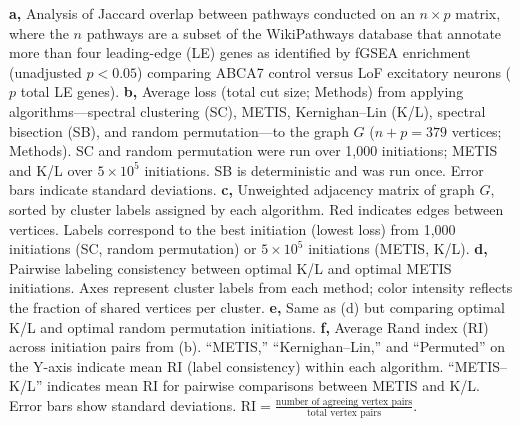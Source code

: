 \textbf{a,} Analysis of Jaccard overlap between pathways conducted on an \( n \times p \) matrix, where the \( n \) pathways are a subset of the WikiPathways database that annotate more than four leading-edge (LE) genes as identified by fGSEA enrichment (unadjusted \( p<0.05 \)) comparing ABCA7 control versus LoF excitatory neurons (\( p \) total LE genes). \textbf{b,} Average loss (total cut size; Methods) from applying algorithms—spectral clustering (SC), METIS, Kernighan–Lin (K/L), spectral bisection (SB), and random permutation—to the graph \( G \) (\( n + p = 379 \) vertices; Methods). SC and random permutation were run over 1,000 initiations; METIS and K/L over \(5 \times 10^5\) initiations. SB is deterministic and was run once. Error bars indicate standard deviations. \textbf{c,} Unweighted adjacency matrix of graph \( G \), sorted by cluster labels assigned by each algorithm. Red indicates edges between vertices. Labels correspond to the best initiation (lowest loss) from 1,000 initiations (SC, random permutation) or \(5 \times 10^5\) initiations (METIS, K/L). \textbf{d,} Pairwise labeling consistency between optimal K/L and optimal METIS initiations. Axes represent cluster labels from each method; color intensity reflects the fraction of shared vertices per cluster. \textbf{e,} Same as (d) but comparing optimal K/L and optimal random permutation initiations. \textbf{f,} Average Rand index (RI) across initiation pairs from (b). “METIS,” “Kernighan–Lin,” and “Permuted” on the Y-axis indicate mean RI (label consistency) within each algorithm. “METIS–K/L” indicates mean RI for pairwise comparisons between METIS and K/L. Error bars show standard deviations. \( \text{RI} = \frac{\text{number of agreeing vertex pairs}}{\text{total vertex pairs}} \).

